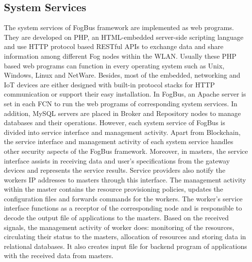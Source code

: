 \documentclass[final,5p,times,twocolumn]{elsarticle}
\begin{document}
\subsection{System Services}
The system services of FogBus framework are implemented as web programs. They are developed on PHP, an HTML-embedded server-side scripting language and use HTTP protocol based RESTful APIs to exchange data and share information among different Fog nodes within the WLAN. Usually these PHP based web programs can function in every operating system such as Unix, Windows, Linux and NetWare. Besides, most of the embedded, networking and IoT devices are either designed with built-in protocol stacks for HTTP communication or support their easy installation. In FogBus, an Apache server is set in each FCN to run the web programs of corresponding system services. In addition, MySQL servers are placed in Broker and Repository nodes to manage databases and their operations. However, each system service of FogBus is divided into service interface and management activity. Apart from Blockchain, the service interface and management activity of each system service handles other security aspects of the FogBus framework. Moreover, in masters, the service interface assists in receiving data and user's specifications from the gateway devices and represents the service results. Service providers also notify the workers IP addresses to masters through this interface. The management activity within the master contains the resource provisioning policies, updates the configuration files and forwards commands for the workers. The worker's service interface functions as a receptor of the corresponding node and is responsible to decode the output file of applications to the masters. Based on the received signals, the management activity of worker does: monitoring of the resources, circulating their status to the masters, allocation of resources and storing data in relational databases. It also creates input file for backend program of applications with the received data from masters.        
%
\end{document}
